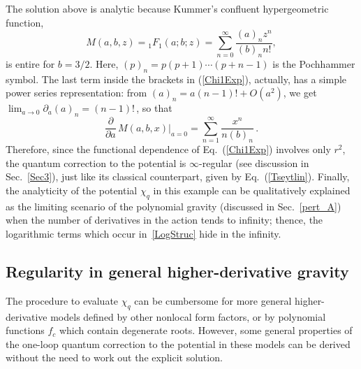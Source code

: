 \documentclass[aps,prd,a4paper,twocolumn,showpacs,showkeys,preprintnumbers,amsmath,amssymb,nofootinbib]{revtex4-2}
\numberwithin{equation}{section}
\def\beq{\begin{equation}}
\def\eeq{\end{equation}}
\newcommand{\eq}[1]{(\ref{#1})}
\def\pa{\partial}
\begin{document}
The solution above is analytic because Kummer's confluent hypergeometric function,
\beq
M(a,b,z) = {}_1 F_1(a;b;z) = \sum_{n = 0}^\infty \frac{(a)_n z^n}{(b)_n n!},
\eeq 
is entire for $b=3/2$. Here,
$(p)_{n}=p(p+1)\cdots(p+n-1)$ is the Pochhammer symbol.
The last term inside the brackets in \eq{Chi1Exp}, actually, has a simple power series representation: from $(a)_n = a (n-1)! + O(a^2)$, we get     
$ \lim_{a \to 0} \pa_a (a)_n = (n-1)! \,$, so that
%
\begin{equation} 
\frac{\partial}{\partial a} \, M\left(a,b,x \right)\Big\vert_{a=0} = \sum _{n=1}^{\infty } \frac{  x^n}{n \left( b\right) _n} \, .
\end{equation}
Therefore, since the functional dependence of Eq.~\eq{Chi1Exp} involves only $r^2$, the quantum correction to the potential is $\infty$-regular (see discussion in Sec.~\ref{Sec3}), just like its classical counterpart, given by Eq.~\eq{Tseytlin}.
Finally, the analyticity of the potential $\chi_q$ in this example can be qualitatively explained as the limiting scenario of the polynomial gravity (discussed in Sec.~\ref{pert_A}) when the number of derivatives in the action tends to infinity; thence, the logarithmic terms which occur in~\eqref{LogStruc} hide in the infinity.




\subsection{Regularity in general higher-derivative gravity}
\label{pert_C}

The procedure to evaluate $\chi_q$ can be cumbersome for more general higher-derivative models defined by other nonlocal form factors, or by polynomial functions $f_c$ which contain degenerate roots. However, some general properties of the one-loop quantum correction to the potential in these models can be derived without the need to work out the explicit solution. 
\end{document}
